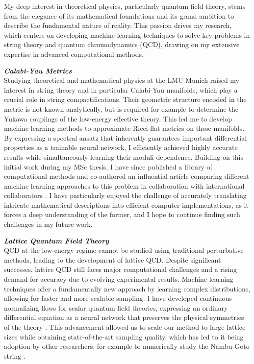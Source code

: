 \documentclass[11pt]{article}
\title{}
\author{}
\date{}
\begin{document}
\thispagestyle{firstpagestyle}

My deep interest in theoretical physics, particularly quantum field theory, stems from the elegance of its mathematical foundations and its grand ambition to describe the fundamental nature of reality.
This passion drives my research, which centers on developing machine learning techniques to solve key problems in string theory and quantum chromodynamics (QCD), drawing on my extensive expertise in advanced computational methods.

\textbf{\textit{{Calabi-Yau Metrics}}}\\
Studying theoretical and mathematical physics at the LMU Munich raised my interest in string theory and in particular Calabi-Yau manifolds, which play a crucial role in string compactifications. Their geometric structure encoded in the metric is not known analytically, but is required for example to determine the Yukawa couplings of the low-energy effective theory. This led me to develop machine learning methods to approximate Ricci-flat metrics on these manifolds. By expressing a spectral ansatz that inherently guarantees important differential properties as a trainable neural network, I efficiently achieved highly accurate results while simultaneously learning their moduli dependence. Building on this initial work during my MSc thesis, I have since published a library of computational methods \cite{gerdes2023CYJAXPackage} and co-authored an influential article comparing different machine learning approaches to this problem in collaboration with international collaborators \cite{anderson2021ModulidependentCalabiYau}.
I have particularly enjoyed the challenge of accurately translating intricate mathematical descriptions into efficient computer implementations, as it forces a deep understanding of the former, and I hope to continue finding such challenges in my future work.

\textbf{\textit{{Lattice Quantum Field Theory}}}\\
QCD at the low-energy regime cannot be studied using traditional perturbative methods, leading to the development of lattice QCD.
Despite significant successes, lattice QCD still faces major computational challenges and a rising demand for accuracy due to evolving experimental results. Machine learning techniques offer a fundamentally new approach by learning complex distributions, allowing for faster and more scalable sampling.
I have developed {continuous normalizing flows} for scalar quantum field theories, expressing an ordinary differential equation as a neural network that preserves the physical symmetries of the theory \cite{gerdes2023LearningLattice}.
This advancement allowed us to scale our method to large lattice sizes while obtaining state-of-the-art sampling quality, which has led to it being adoption by other researchers, for example to numerically study the Nambu-Goto string \cite{casella2024SamplingLattice}.
\end{document}
